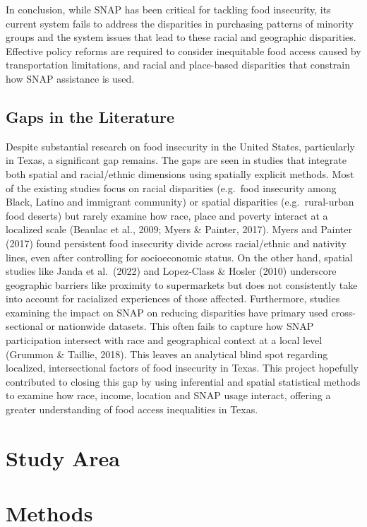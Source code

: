 \documentclass[
]{article}
\begin{document}
In conclusion, while SNAP has been critical for tackling food
insecurity, its current system fails to address the disparities in
purchasing patterns of minority groups and the system issues that lead
to these racial and geographic disparities. Effective policy reforms are
required to consider inequitable food access caused by transportation
limitations, and racial and place-based disparities that constrain how
SNAP assistance is used.

\subsection{Gaps in the Literature}\label{gaps-in-the-literature}

Despite substantial research on food insecurity in the United States,
particularly in Texas, a significant gap remains. The gaps are seen in
studies that integrate both spatial and racial/ethnic dimensions using
spatially explicit methods. Most of the existing studies focus on racial
disparities (e.g.~food insecurity among Black, Latino and immigrant
community) or spatial disparities (e.g.~rural-urban food deserts) but
rarely examine how race, place and poverty interact at a localized scale
(Beaulac et al., 2009; Myers \& Painter, 2017). Myers and Painter (2017)
found persistent food insecurity divide across racial/ethnic and
nativity lines, even after controlling for socioeconomic status. On the
other hand, spatial studies like Janda et al.~(2022) and Lopez-Class \&
Hosler (2010) underscore geographic barriers like proximity to
supermarkets but does not consistently take into account for racialized
experiences of those affected. Furthermore, studies examining the impact
on SNAP on reducing disparities have primary used cross-sectional or
nationwide datasets. This often fails to capture how SNAP participation
intersect with race and geographical context at a local level (Grummon
\& Taillie, 2018). This leaves an analytical blind spot regarding
localized, intersectional factors of food insecurity in Texas. This
project hopefully contributed to closing this gap by using inferential
and spatial statistical methods to examine how race, income, location
and SNAP usage interact, offering a greater understanding of food access
inequalities in Texas.

\section{Study Area}\label{study-area}

\section{Methods}\label{methods}
\end{document}
